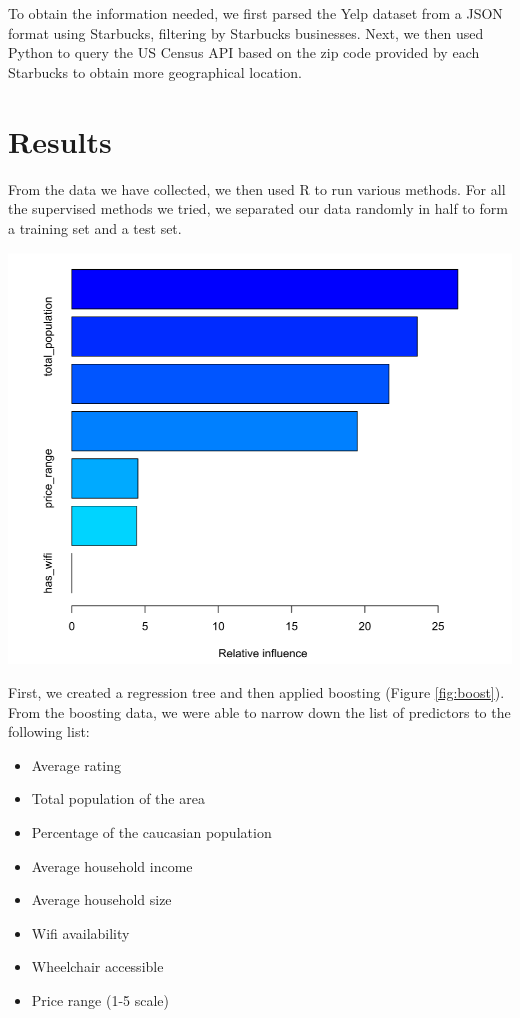 \documentclass{article}
\newenvironment{Figure}
  {\par\medskip\noindent\minipage{\linewidth}}
  {\endminipage\par\medskip}
\begin{document}
\begin{multicols}{2}
	To obtain the information needed, we first parsed the Yelp dataset from a JSON format using Starbucks, filtering by Starbucks businesses. Next, we then used Python to query the US Census API based on the zip code provided by each Starbucks to obtain more geographical location. 

\section{Results}

	From the data we have collected, we then used R to run various methods. For all the supervised methods we tried, we separated our data randomly in half to form a training set and a test set. 

\begin{Figure}
\centering
   \includegraphics[width=\linewidth]{boostingChart}
	\label{fig:boost}
\end{Figure}

	First, we created a regression tree and then applied boosting (Figure \ref{fig:boost}). From the boosting data, we were able to narrow down the list of predictors to the following list:

\begin{itemize}[noitemsep,topsep=8pt,parsep=0pt,partopsep=0pt]
	\item Average rating
	\item Total population of the area
	\item Percentage of the caucasian population
	\item Average household income
	\item Average household size
	\item Wifi availability
	\item Wheelchair accessible
	\item Price range (1-5 scale)
\end{itemize}


\end{multicols}
\end{document}
